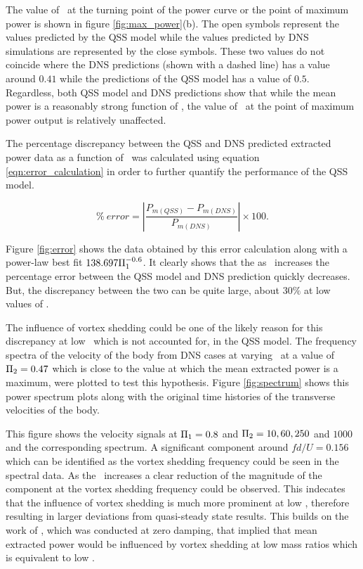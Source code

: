 The value of \massdamp\ at the turning point  of the power curve or the point of maximum power is shown in figure \ref{fig:max_power}(b). The open symbols represent the values predicted by the QSS model while the values predicted by DNS simulations are represented by the close symbols. These two values do not coincide where the DNS predictions (shown with a dashed line) has a value around $0.41$ while the predictions of the QSS model has a value of $0.5$. Regardless, both QSS model and DNS predictions show that while the mean power is a reasonably strong function of \massstiff, the value of \massdamp\ at the point of maximum power output is relatively unaffected.


The percentage discrepancy between the QSS and DNS predicted extracted power data as a function of \massstiff\ was calculated using equation \ref{eqn:error_calculation} in order to further quantify the performance of the QSS model.  
 
\begin{equation}   \label{eqn:error_calculation} 
\% \ error=\left|{\frac{P_{m(QSS)} - P_{m(DNS)}}{P_{m(DNS)}}}\right| \times 100.
\end{equation}

Figure \ref{fig:error} shows the data obtained by this error calculation along with a power-law best fit $138.697\Pi_1^{-0.6}$. It clearly shows that the as \massstiff\ increases the percentage error between the QSS model and DNS prediction quickly decreases. But, the discrepancy between the two can be quite large, about $30\%$ at low values of \massstiff.



The influence of vortex shedding could be one of the likely reason for this discrepancy at low \massstiff\ which is not accounted for, in the QSS model. The frequency spectra of the velocity of the body from DNS cases at varying \massstiff\  at a value of $\Pi_2=0.47$ which is close to the value at which the mean extracted power is a maximum, were plotted to test this hypothesis. Figure \ref{fig:spectrum} shows this power spectrum plots along with the original time histories of the transverse velocities of the body. 





This figure shows the  velocity signals at $\Pi_1=0.8$ and $\Pi_2= 10, 60, 250$ and $1000$ and the corresponding spectrum. A significant component around $fd/U=0.156$ which can be identified as the vortex shedding frequency could be seen in the spectral data. As the \massstiff\ increases a clear reduction of the magnitude of the component at the  vortex shedding frequency could be observed. This indecates that the influence of vortex shedding is much more prominent at low \massstiff,  therefore resulting in larger deviations from quasi-steady state results. This builds on the work of \cite{Joly2012}, which was conducted at zero damping, that implied that mean extracted power would be influenced by vortex shedding at low mass ratios which is equivalent to low \massstiff.

